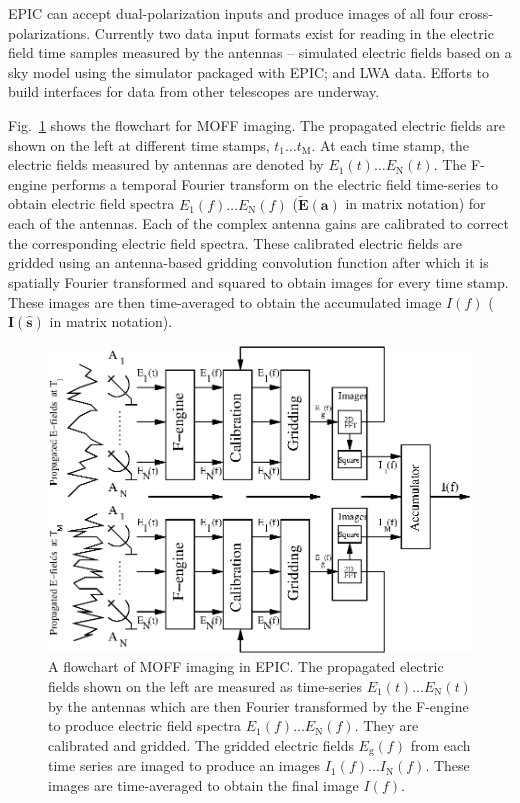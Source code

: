 \documentclass[a4paper,fleqn,usenatbib]{../mnras}
\begin{document}
EPIC can accept dual-polarization inputs and produce images of all four 
cross-polarizations. Currently two data input formats exist for reading in the 
electric field time samples measured by the antennas -- simulated electric 
fields based on a sky model using the simulator packaged with EPIC; and LWA 
data. Efforts to build interfaces for data from other telescopes are underway.

Fig.~\ref{fig:MOFF-flowchart} shows the flowchart for MOFF imaging. The
propagated electric fields are shown on the left at different time stamps,
$t_1\ldots t_\textrm{M}$. At each time stamp, the electric fields measured by
antennas are denoted by $E_1(t)\ldots E_\textrm{N}(t)$. The F-engine performs a
temporal Fourier transform on the electric field time-series to obtain electric
field spectra $E_1(f)\ldots E_\textrm{N}(f)$ 
($\widetilde{\mathbf{E}}(\mathbf{a})$ in matrix notation) for each of the 
antennas. Each of the complex antenna gains are calibrated to correct the 
corresponding electric field spectra. These calibrated electric fields are 
gridded using an antenna-based gridding convolution function after which it is 
spatially Fourier transformed and squared to obtain images for every time stamp. 
These images are then time-averaged to obtain the accumulated image 
$I(f)$ ($\mathbf{I}(\hat{\mathbf{s}})$ in matrix notation).
\begin{figure}
  \includegraphics[width=\columnwidth]{MOFF_flowchart.eps}
  \caption{A flowchart of MOFF imaging in EPIC. The propagated electric fields
    shown on the left are measured as time-series $E_1(t)\ldots E_\textrm{N}(t)$
    by the antennas which are then Fourier transformed by the F-engine to produce
    electric field spectra $E_1(f)\ldots E_\textrm{N}(f)$. They are calibrated and
    gridded. The gridded electric fields $E_\textrm{g}(f)$ from each time series
    are imaged to produce an images $I_1(f)\ldots I_\textrm{N}(f)$. These images
    are time-averaged to obtain the final image $I(f)$.}
  \label{fig:MOFF-flowchart}
\end{figure}
\end{document}
